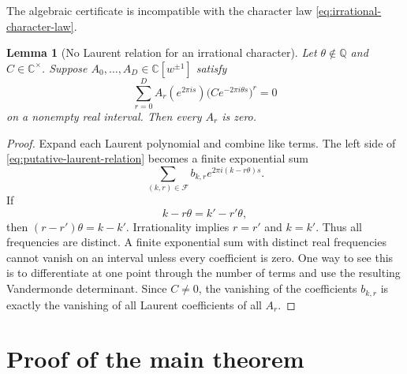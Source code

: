 \documentclass[reqno]{amsart}
\newtheorem{lemma}[theorem]{Lemma}
\theoremstyle{remark}
\numberwithin{equation}{section}
\newcommand{\Q}{\mathbb{Q}}
\newcommand{\C}{\mathbb{C}}
\begin{document}
The algebraic certificate is incompatible with the character law
\eqref{eq:irrational-character-law}.

\begin{lemma}[No Laurent relation for an irrational character]
\label{lem:no-laurent-relation}
Let \(\theta\notin\Q\) and \(C\in\C^\times\). Suppose
\(A_0,\ldots,A_D\in\C[w^{\pm1}]\) satisfy
\begin{equation}
  \sum_{r=0}^{D}
  A_r(e^{2\pi i s})
  \bigl(Ce^{-2\pi i\theta s}\bigr)^r=0
  \label{eq:putative-laurent-relation}
\end{equation}
on a nonempty real interval. Then every \(A_r\) is zero.
\end{lemma}

\begin{proof}
Expand each Laurent polynomial and combine like terms. The left side of
\eqref{eq:putative-laurent-relation} becomes a finite exponential sum
\[
  \sum_{(k,r)\in\mathcal F}
  b_{k,r}e^{2\pi i(k-r\theta)s}.
\]
If
\[
  k-r\theta=k'-r'\theta,
\]
then \((r-r')\theta=k-k'\). Irrationality implies \(r=r'\) and \(k=k'\).
Thus all frequencies are distinct. A finite exponential sum with distinct
real frequencies cannot vanish on an interval unless every coefficient is
zero. One way to see this is to differentiate at one point through the number of terms and
use the resulting Vandermonde determinant. Since \(C\neq0\), the vanishing of
the coefficients \(b_{k,r}\) is exactly the vanishing of all Laurent
coefficients of all \(A_r\).
\end{proof}

\section{Proof of the main theorem}
\label{sec:main-proof}
\end{document}
